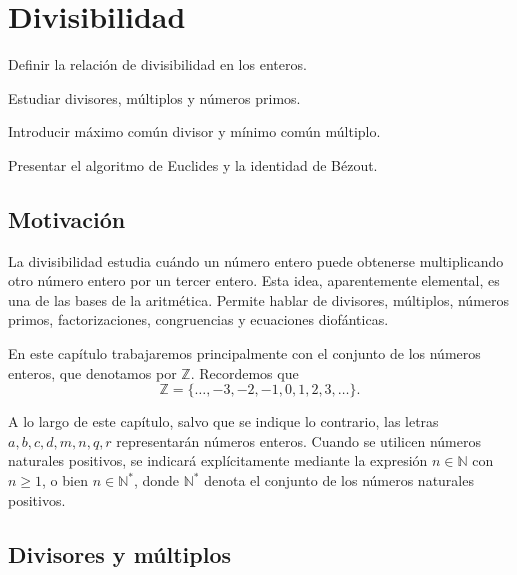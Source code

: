 
\chapter{Divisibilidad}

\begin{objetivos}
  \item Definir la relación de divisibilidad en los enteros.
  \item Estudiar divisores, múltiplos y números primos.
  \item Introducir máximo común divisor y mínimo común múltiplo.
  \item Presentar el algoritmo de Euclides y la identidad de Bézout.
\end{objetivos}

\section{Motivación}

La divisibilidad estudia cuándo un número entero puede obtenerse multiplicando otro número entero por un tercer entero. Esta idea, aparentemente elemental, es una de las bases de la aritmética. Permite hablar de divisores, múltiplos, números primos, factorizaciones, congruencias y ecuaciones diofánticas.

En este capítulo trabajaremos principalmente con el conjunto de los números enteros, que denotamos por \(\mathbb{Z}\). Recordemos que
\[
\mathbb{Z}=\{\ldots,-3,-2,-1,0,1,2,3,\ldots\}.
\]

\begin{convencion}
A lo largo de este capítulo, salvo que se indique lo contrario, las letras \(a,b,c,d,m,n,q,r\) representarán números enteros. Cuando se utilicen números naturales positivos, se indicará explícitamente mediante la expresión \(n\in \mathbb{N}\) con \(n\geq 1\), o bien \(n\in \mathbb{N}^{\ast}\), donde \(\mathbb{N}^{\ast}\) denota el conjunto de los números naturales positivos.
\end{convencion}

\section{Divisores y múltiplos}

